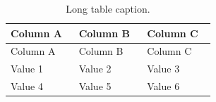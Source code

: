 \begin{longtable}{p{0.3\linewidth}p{0.3\linewidth}p{0.3\linewidth}}
  \caption{Long table caption.}\label{tab:long}\\
  \toprule
  Column A & Column B & Column C \\
  \midrule
  \endfirsthead
  \toprule
  Column A & Column B & Column C \\
  \midrule
  \endhead
  \bottomrule
  \endfoot
  Value 1 & Value 2 & Value 3 \\
  Value 4 & Value 5 & Value 6 \\
  \bottomrule
\end{longtable}
